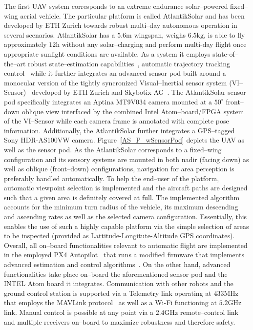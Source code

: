 \documentclass{article}
\begin{document}
The first UAV system corresponds to an extreme endurance solar--powered fixed--wing aerial vehicle. The particular platform is called AtlantikSolar \cite{AtlantikSolarSite} and has been developed by ETH Zurich towards robust multi--day autonomous operation in several scenarios.
AtlantikSolar has a $5.6\textrm{m}$ wingspan, weighs $6.5\textrm{kg}$, is able to fly approximately $12\textrm{h}$ without any solar--charging and perform multi-day flight once appropriate sunlight conditions are available.
As a system it employs  state-of--the--art robust state--estimation capabilities~\cite{LMAS_MSC_14}, automatic trajectory tracking control~\cite{OMLAS_MED_14} while it further integrates an advanced sensor pod built around a monocular version of the tightly syncronized Visual--Inertial sensor system (VI--Sensor)~\cite{nikolic2014synchronized} developed by ETH Zurich and Skybotix AG~\cite{SkybotixSite}.
The AtlantikSolar sensor pod specifically integrates an Aptina MT9V034 camera mounted at a $50^\circ$ front--down oblique view interfaced by the combined Intel Atom--board/FPGA system of the VI--Sensor while each camera frame is annotated with complete pose information.
Additionally, the AtlantikSolar further integrates a GPS--tagged Sony HDR-AS100VW camera. Figure~\ref{AS_P_wSensorPod} depicts the UAV as well as the sensor pod.
As the AtlantikSolar corresponds to a fixed--wing configuration and its sensory systems are mounted in both nadir (facing down) as well as oblique (front--down) configurations, navigation for area perception is preferably handled automatically.
To help the end--user of the platform, automatic viewpoint selection is implemented and the aircraft paths are designed such that a given area is definitely covered at full.
The implemented algorithm accounts for the minimum turn radius of the vehicle, its maximum descending and ascending rates as well as the selected camera configuration.
Essentially, this enables the use of such a highly capable platform via the simple selection of areas to be inspected (provided as Lattitude-Longitute-Altitude GPS coordinates).
Overall, all on--board functionalities relevant to automatic flight are implemented in the employed PX4 Autopilot~\cite{PIXHAWKSite} that runs a modified firmware that implements advanced estimation and control algorithms~\cite{LMAS_MSC_14}\cite{OMLAS_MED_14}.
On the other hand, advanced functionalities take place on--board the aforementioned sensor pod and the INTEL Atom board it integrates.
Communication with other robots and the ground control station is supported via a Telemetry link operating at $433\textrm{MHz}$ that employs the MAVLink protocol~\cite{PIXHAWKSite} as well as a Wi-Fi functioning at $5.2\textrm{GHz}$link.
Manual control is possible at any point via a $2.4\textrm{GHz}$ remote--control link and multiple receivers on--board to maximize robustness and therefore safety.
\end{document}
